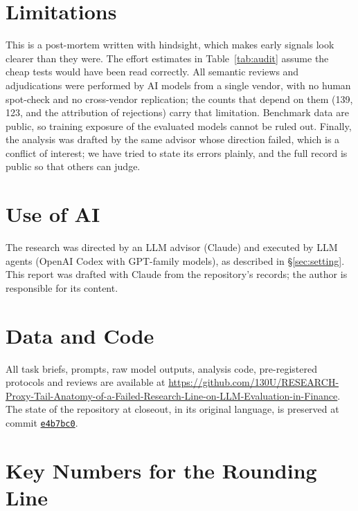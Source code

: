 \documentclass[11pt]{article}
\newcommand{\repourl}{https://github.com/130U/RESEARCH-Proxy-Tail-Anatomy-of-a-Failed-Research-Line-on-LLM-Evaluation-in-Finance}
\begin{document}
\section*{Limitations}

This is a post-mortem written with hindsight, which makes early signals look clearer than they were. The effort estimates in Table~\ref{tab:audit} assume the cheap tests would have been read correctly. All semantic reviews and adjudications were performed by AI models from a single vendor, with no human spot-check and no cross-vendor replication; the counts that depend on them (139, 123, and the attribution of rejections) carry that limitation. Benchmark data are public, so training exposure of the evaluated models cannot be ruled out. Finally, the analysis was drafted by the same advisor whose direction failed, which is a conflict of interest; we have tried to state its errors plainly, and the full record is public so that others can judge.

\section*{Use of AI}

The research was directed by an LLM advisor (Claude) and executed by LLM agents (OpenAI Codex with GPT-family models), as described in \S\ref{sec:setting}. This report was drafted with Claude from the repository's records; the author is responsible for its content.

\section*{Data and Code}

All task briefs, prompts, raw model outputs, analysis code, pre-registered protocols and reviews are available at \url{\repourl}. The state of the repository at closeout, in its original language, is preserved at commit \href{\repourl/tree/e4b7bc061976bcdd2f48c437172b034351ac7e77}{\texttt{e4b7bc0}}.



\appendix

\section{Key Numbers for the Rounding Line}
\label{app:numbers}
\end{document}
